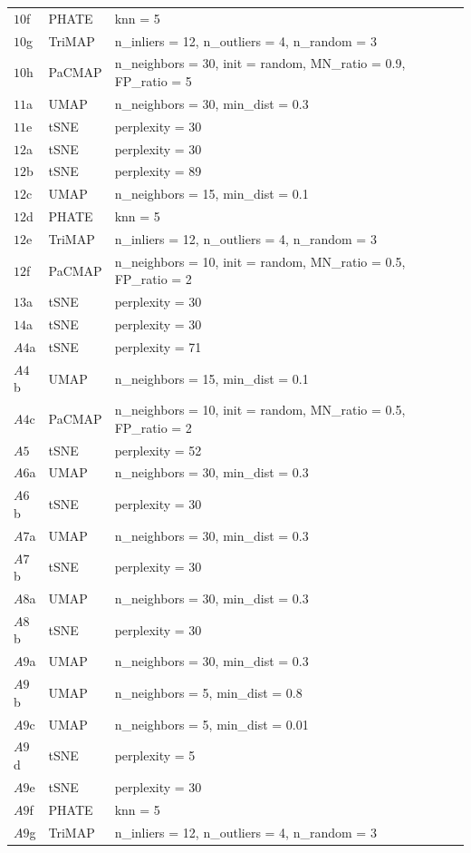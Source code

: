 \documentclass[
  12pt]{article}
\begin{document}
\begin{longtable}{>{\raggedright\arraybackslash}p{1.5cm}>{\raggedright\arraybackslash}p{2cm}>{\raggedright\arraybackslash}p{10cm}}
$10$f & PHATE & knn = 5\\
$10$g & TriMAP & n\_inliers = 12, n\_outliers = 4, n\_random = 3\\
$10$h & PaCMAP & n\_neighbors = 30, init = random, MN\_ratio = 0.9, FP\_ratio = 5\\
\midrule
$11$a & UMAP & n\_neighbors = 30, min\_dist = 0.3\\
$11$e & tSNE & perplexity = 30\\
\midrule
$12$a & tSNE & perplexity = 30\\
$12$b & tSNE & perplexity = 89\\
$12$c & UMAP & n\_neighbors = 15, min\_dist = 0.1\\
$12$d & PHATE & knn = 5\\
$12$e & TriMAP & n\_inliers = 12, n\_outliers = 4, n\_random = 3\\
$12$f & PaCMAP & n\_neighbors = 10, init = random, MN\_ratio = 0.5, FP\_ratio = 2\\
\midrule
$13$a & tSNE & perplexity = 30\\
\midrule
$14$a & tSNE & perplexity = 30\\
\midrule
$A4$a & tSNE & perplexity = 71\\
$A4$b & UMAP & n\_neighbors = 15, min\_dist = 0.1\\
$A4$c & PaCMAP & n\_neighbors = 10, init = random, MN\_ratio = 0.5, FP\_ratio = 2\\
\midrule
$A5$ & tSNE & perplexity = 52\\
\midrule
$A6$a & UMAP & n\_neighbors = 30, min\_dist = 0.3\\
$A6$b & tSNE & perplexity = 30\\
\midrule
$A7$a & UMAP & n\_neighbors = 30, min\_dist = 0.3\\
$A7$b & tSNE & perplexity = 30\\
\midrule
$A8$a & UMAP & n\_neighbors = 30, min\_dist = 0.3\\
$A8$b & tSNE & perplexity = 30\\
\midrule
$A9$a & UMAP & n\_neighbors = 30, min\_dist = 0.3\\
$A9$b & UMAP & n\_neighbors = 5, min\_dist = 0.8\\
$A9$c & UMAP & n\_neighbors = 5, min\_dist = 0.01\\
$A9$d & tSNE & perplexity = 5\\
$A9$e & tSNE & perplexity = 30\\
$A9$f & PHATE & knn = 5\\
$A9$g & TriMAP & n\_inliers = 12, n\_outliers = 4, n\_random = 3\\

\end{longtable}
\end{document}
